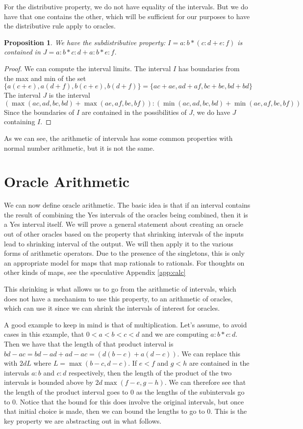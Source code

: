 \documentclass[12pt]{article}
\newtheorem{proposition}{Proposition}
\theoremstyle{remark}
\begin{document}
For the distributive property, we do not have equality of the intervals. But we do have that one contains the other, which will be sufficient for our purposes to have the distributive rule apply to oracles. 

\begin{proposition}
We have the subdistributive property: $I = a:b*(c:d + e:f)$ is contained in $J = a:b*c:d + a:b*e:f$. 
\end{proposition}

\begin{proof}
We can compute the interval limits. The interval $I$ has boundaries from the max and min of the set 
\[
\{a(c+e), a(d+f), b(c+e), b(d+f)\} = \{ac+ae, ad+af, bc+be, bd+bd\}
\] 
The interval $J$ is the interval 
\[
(\max(ac, ad, bc, bd) + \max(ae, af, be, bf) ) : (\min(ac, ad, bc, bd) + \min(ae, af, be, bf) )
\]
Since the boundaries of $I$ are contained in the possibilities of $J$, we do have $J$ containing $I$.
\end{proof}

As we can see, the arithmetic of intervals has some common properties with normal number arithmetic, but it is not the same.



\section{Oracle Arithmetic}

We can now define oracle arithmetic. The basic idea is that if an interval contains the result of combining the Yes intervals of the oracles being combined, then it is a Yes interval itself. 
We will prove a general statement about creating an oracle out of other oracles based on the property that shrinking intervals of the inputs lead to shrinking interval of the output. We will then apply it to the various forms of arithmetic operators. Due to the presence of the singletons, this is only an appropriate model for maps that map rationals to rationals. For thoughts on other kinds of maps, see the speculative Appendix \ref{app:calc}

This shrinking is what allows us to go from the arithmetic of intervals, which does not have a mechanism to use this property, to an arithmetic of oracles, which can use it since we can shrink the intervals of interest for oracles. 

A good example to keep in mind is that of multiplication. Let's assume, to avoid cases in this example, that  $0 < a < b < c < d$ and we are computing $a:b*c:d$. Then we have that the length of that product interval is $bd-ac = bd-ad+ad - ac= (d(b-c) + a(d-c))$. We can replace this with $2dL$ where $L = \max(b-c, d-c)$. If $e<f$ and $g<h$ are contained in the intervals $a:b$ and $c:d$ respectively, then the length of the product of the two intervals is bounded above by $2d\max(f-e, g-h)$. We can therefore see that the length of the product interval goes to 0 as the lengths of the subintervals go to 0. Notice that the bound for this does involve the original intervals, but once that initial choice is made, then we can bound the lengths to go to 0. This is the key property we are abstracting out in what follows. 
\end{document}
